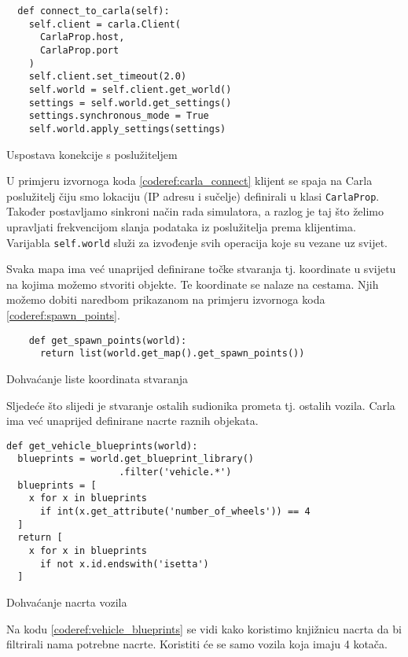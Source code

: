 \begin{listing}[h!]
  \begin{verbatim}
  def connect_to_carla(self):
    self.client = carla.Client(
      CarlaProp.host,
      CarlaProp.port
    )
    self.client.set_timeout(2.0)
    self.world = self.client.get_world()
    settings = self.world.get_settings()
    settings.synchronous_mode = True
    self.world.apply_settings(settings)
  \end{verbatim}
  \caption{Uspostava konekcije s poslužiteljem}
  \label{coderef:carla_connect}
\end{listing}

U primjeru izvornoga koda \ref{coderef:carla_connect} klijent se spaja na Carla poslužitelj čiju smo lokaciju (IP adresu i sučelje) definirali u klasi \texttt{CarlaProp}. Također postavljamo sinkroni način rada simulatora, a razlog je taj što želimo upravljati frekvencijom slanja podataka iz poslužitelja prema klijentima. Varijabla \texttt{self.world} služi za izvođenje svih operacija koje su vezane uz svijet.

Svaka mapa ima već unaprijed definirane točke stvaranja tj. koordinate u svijetu na kojima možemo stvoriti objekte. Te koordinate se nalaze na cestama. Njih možemo dobiti naredbom prikazanom na primjeru izvornoga koda \ref{coderef:spawn_points}. 

\begin{listing}[h!]
  \begin{verbatim}
    def get_spawn_points(world):
      return list(world.get_map().get_spawn_points())
  \end{verbatim}
  \caption{Dohvaćanje liste koordinata stvaranja}
  \label{coderef:spawn_points}
\end{listing}

Sljedeće što slijedi je stvaranje ostalih sudionika prometa tj. ostalih vozila. Carla ima već unaprijed definirane nacrte raznih objekata.

\begin{listing}[h!]
  \begin{verbatim}
def get_vehicle_blueprints(world):
  blueprints = world.get_blueprint_library()
                    .filter('vehicle.*')
  blueprints = [
    x for x in blueprints
      if int(x.get_attribute('number_of_wheels')) == 4
  ]
  return [
    x for x in blueprints
      if not x.id.endswith('isetta')
  ]
  \end{verbatim}
  \caption{Dohvaćanje nacrta vozila}
  \label{coderef:vehicle_blueprints}
\end{listing}
\pagebreak
Na kodu \ref{coderef:vehicle_blueprints} se vidi kako koristimo knjižnicu nacrta da bi filtrirali nama potrebne nacrte. Koristiti će se samo vozila koja imaju 4 kotača.

